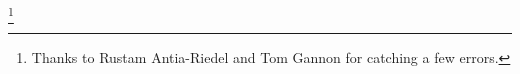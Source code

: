 
\author{Arun Debray}
\date{\today}
\thanks{Thanks to Rustam Antia-Riedel and Tom Gannon for catching a few errors.}

\usepackage[charter]{mathdesign}
\usepackage[T1]{fontenc}

\renewcommand{\term}[1]{{\bfseries #1}}
\newcommand{\sSet}{\cat{sSet}}
\DeclareMathOperator{\Map}{Map}
